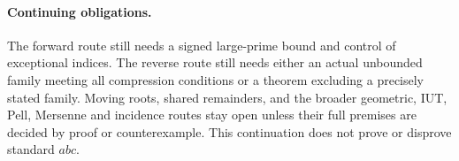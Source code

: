 \paragraph{Continuing obligations.}
The forward route still needs a signed large-prime bound and control of
exceptional indices. The reverse route still needs either an actual unbounded
family meeting all compression conditions or a theorem excluding a precisely
stated family. Moving roots, shared remainders, and the broader geometric,
IUT, Pell, Mersenne and incidence routes stay open unless their full premises
are decided by proof or counterexample. This continuation does not prove or
disprove standard $abc$.
